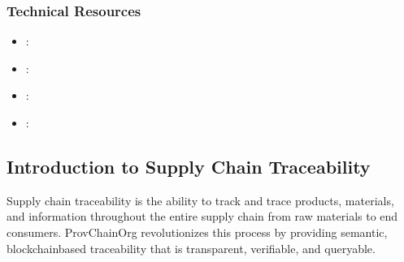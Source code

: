 \documentclass[letterpaper,10pt,english]{sphinxmanual}
\begin{document}
\subsubsection{Technical Resources}
\label{\detokenize{foundational/intro-to-rdf-blockchain:technical-resources}}\begin{itemize}
\item {} 
\sphinxAtStartPar
{}: 

\item {} 
\sphinxAtStartPar
{}: 

\item {} 
\sphinxAtStartPar
{}: 

\item {} 
\sphinxAtStartPar
{}: 

\end{itemize}

\sphinxstepscope


\subsection{Introduction to Supply Chain Traceability}
\label{\detokenize{foundational/intro-to-supply-chain-traceability:introduction-to-supply-chain-traceability}}\label{\detokenize{foundational/intro-to-supply-chain-traceability::doc}}
\sphinxAtStartPar
Supply chain traceability is the ability to track and trace products, materials, and information throughout the entire supply chain \sphinxhyphen{} from raw materials to end consumers. ProvChainOrg revolutionizes this process by providing semantic, blockchain\sphinxhyphen{}based traceability that is transparent, verifiable, and queryable.
\end{document}
